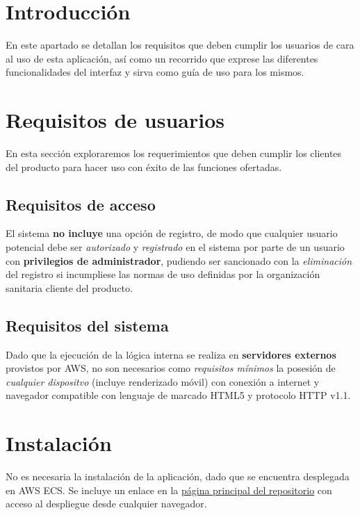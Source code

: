 
\section{Introducción}

En este apartado se detallan los requisitos que deben cumplir los usuarios de cara al uso de esta aplicación, así como un recorrido que exprese las diferentes funcionalidades del interfaz y sirva como guía de uso para los mismos.

\section{Requisitos de usuarios}

En esta sección exploraremos los requerimientos que deben cumplir los clientes del producto para hacer uso con éxito de las funciones ofertadas.

\subsection{Requisitos de acceso}

El sistema \textbf{no incluye} una opción de registro, de modo que cualquier usuario potencial debe ser \textit{autorizado} y \textit{registrado} en el sistema por parte de un usuario con \textbf{privilegios de administrador}, pudiendo ser sancionado con la \textit{eliminación} del registro si incumpliese las normas de uso definidas por la organización sanitaria cliente del producto.

\subsection{Requisitos del sistema}

Dado que la ejecución de la lógica interna se realiza en \textbf{servidores externos} provistos por AWS, no son necesarios como \textit{requisitos mínimos} la posesión de \textit{cualquier dispositvo} (incluye renderizado móvil) con conexión a internet y navegador compatible con lenguaje de marcado HTML5 y protocolo HTTP v1.1.

\section{Instalación}

No es necesaria la instalación de la aplicación, dado que se encuentra desplegada en AWS ECS.
Se incluye un enlace en la \href{https://github.com/jesgararm/GestorQuirofanos}{página principal del repositorio} con acceso al despliegue desde cualquier navegador.

